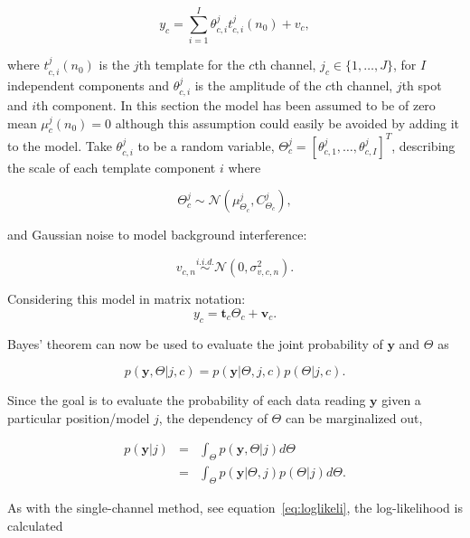 \begin{equation}\label{eq:mod1_c}
y_c = \sum_{i=1}^{I} \theta_{c,i}^j t_{c,i}^j(n_0) + v_c,
\end{equation}

where $t_{c,i}^j(n_0)$ is the $j$th template for the $c$th channel, $j_c \in \{1, \ldots ,J\}$, for $I$ independent components and $\theta_{c,i}^j$ is the amplitude of the $c$th channel, $j$th spot and $i$th component. In this section the model has been assumed to be of zero mean $\mu_c^j(n_0) =0$ although this assumption could easily be avoided by adding it to the model. Take $\theta_{c,i}^j$ to be a random variable, $\Theta_c^j = [\theta_{c,1}^j,\ldots,\theta_{c,I}^j]^T$, describing the scale of each template component $i$ where

\begin{equation}\label{eq:theta_c}
\Theta_c^j \sim \mathcal{N}(\mu_{\Theta_c}^j,C_{\Theta_c}^j),
\end{equation}

and Gaussian noise to model background interference:

\begin{equation}\label{eq:noise_c}
v_{c,n} \stackrel{i.i.d.}{\sim} \mathcal{N}(0,\sigma_{v,c,n}^2).
\end{equation}

Considering this model in matrix notation:
\begin{equation}\label{eq:mod2}
y_c = \textbf{t}_c\Theta_c + \textbf{v}_c.
\end{equation}

Bayes' theorem can now be used to evaluate the joint probability of $\textbf{y}$ and $\Theta$ as

\begin{equation}\label{eq:bayes1_c}
p(\textbf{y},\Theta | j, c) = p(\textbf{y}|\Theta,j,c)p(\Theta | j,c).
\end{equation}

Since the goal is to evaluate the probability of each data reading $\textbf{y}$ given a particular position/model $j$, the dependency of $\Theta$ can be marginalized out,

\begin{eqnarray}\nonumber
p(\textbf{y}|j) &=& \int_\Theta p(\textbf{y},\Theta|j) d\Theta \\
\label{eq:marg1_c} &=& \int_\Theta p(\textbf{y}|\Theta,j)p(\Theta|j) d\Theta.
\end{eqnarray}

As with the single-channel method, see equation~\ref{eq:loglikeli}, the log-likelihood is calculated

